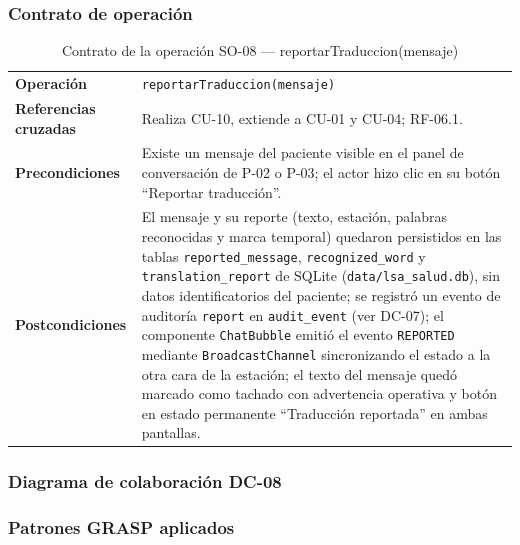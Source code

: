\subsubsection{Contrato de operación}

\begin{table}[H]
\centering
\begin{tabularx}{\textwidth}{@{}p{4.4cm} X@{}}
\toprule
\textbf{Operación} & \texttt{reportarTraduccion(mensaje)} \\
\textbf{Referencias cruzadas} & Realiza CU-10, extiende a CU-01 y CU-04; RF-06.1. \\
\textbf{Precondiciones} & Existe un mensaje del paciente visible en el
panel de conversación de P-02 o P-03; el actor hizo clic en su botón
``Reportar traducción''. \\
\textbf{Postcondiciones} & El mensaje y su reporte (texto, estación,
palabras reconocidas y marca temporal) quedaron persistidos en las tablas
\texttt{reported\_message}, \texttt{recognized\_word} y
\texttt{translation\_report} de SQLite (\texttt{data/lsa\_salud.db}), sin
datos identificatorios del paciente; se registró un evento de auditoría
\texttt{report} en \texttt{audit\_event} (ver DC-07); el componente
\texttt{ChatBubble} emitió el evento \texttt{REPORTED} mediante
\texttt{BroadcastChannel} sincronizando el estado a la otra cara de la
estación; el texto del mensaje quedó marcado como tachado con advertencia
operativa y botón en estado permanente ``Traducción reportada'' en ambas
pantallas. \\
\bottomrule
\end{tabularx}
\caption{Contrato de la operación SO-08 --- reportarTraduccion(mensaje)}
\label{tab:col-contrato-so08}
\end{table}

\subsubsection{Diagrama de colaboración DC-08}


\subsubsection{Patrones GRASP aplicados}

